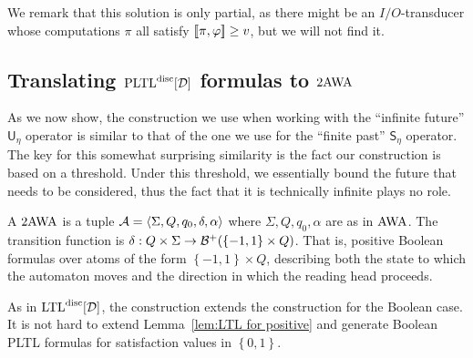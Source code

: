 \documentclass{llncs}
\newcommand{\set}[1]{{\left\{#1\right\}}}
\newcommand{\zug}[1]{\langle #1  \rangle}
\newcommand{\LTL}{{\ensuremath{\rm LTL}}\xspace}
\newcommand{\PLTL}{{\ensuremath{\rm PLTL}}\xspace}
\newcommand{\Until}{\mathsf{U}}
\newcommand{\Since}{\mathsf{S}}
\newcommand{\AWW}{\mbox{\rm AWA}\xspace}
\newcommand{\twAWW}{\mbox{\rm 2AWA}\xspace}
\newcommand{\B}{{\cal B}}
\newcommand{\D}{{\cal D}}
\newcommand{\A}{{\cal A}}
\renewcommand{\phi}{\varphi}
\newcommand{\DLTL}{\ensuremath{\LTL^{\text{disc}}[\D]}}
\newcommand{\DPLTL}{\ensuremath{\PLTL^{\text{disc}}[\D]}}
\newcommand{\df}{\eta}
\begin{document}
We remark that this solution is only partial, as there might be an $I/O$-transducer whose computations $\pi$ all satisfy $\sem{\pi,\phi}\ge v$, but we will not find it. 



\subsection{Translating $\DPLTL$ formulas to $\twAWW$}
\label{apx:LTL with past}
As we now show, the construction we use when working with the ``infinite future'' $\Until_\df$ operator is similar to that of the one we use for the ``finite past'' $\Since_\df$ operator.
The key for this somewhat surprising similarity is the fact our construction is based on a threshold. Under this threshold, we essentially bound the future that needs to be considered, thus the fact that it is technically infinite plays no role.









A $\twAWW$ is a tuple $\A=\zug{\Sigma,Q,q_0,\delta,\alpha}$ where $\Sigma,Q,q_0,\alpha$ are as in $\AWW$. The transition function is $\delta:Q\times \Sigma\to \B^+(\set{-1,1}\times Q)$. That is, positive Boolean formulas over atoms of the form $\set{-1,1}\times Q$, describing both the state to which the automaton moves and the direction in which the reading head proceeds.


As in $\DLTL$, the construction extends the construction for the Boolean case. 
It is not hard to extend Lemma~\ref{lem:LTL for positive} and generate Boolean PLTL formulas for satisfaction values in $\set{0,1}$. 
\end{document}
